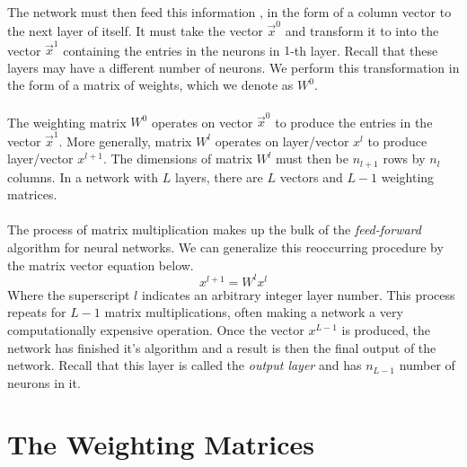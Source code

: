 \documentclass[12pt,letterpaper]{article}
\begin{document}
\paragraph*{}The network must then feed this information , in the form of a column vector to the next layer of itself. It must take the vector $\vec{x}^0$ and transform it to into the vector $\vec{x}^1$ containing the entries in the neurons in $1$-th layer. Recall that these layers may have a different number of neurons. We perform this transformation in the form of a matrix of weights, which we denote as $W^0$.
\paragraph*{}The weighting matrix $W^0$ operates on vector $\vec{x}^0$ to produce the entries in the vector $\vec{x}^1$. More generally, matrix $W^l$ operates on layer/vector $x^l$ to produce layer/vector $x^{l+1}$. The dimensions of matrix $W^l$ must then be $n_{l+1}$ rows by $n_l$ columns. In a network with $L$ layers, there are $L$ vectors and $L-1$ weighting matrices.
\paragraph*{}The process of matrix multiplication makes up the bulk of the \textit{feed-forward} algorithm for neural networks. We can generalize this reoccurring procedure by the matrix vector equation below.
\begin{equation}
\label{feed forward}
x^{l+1} = W^l x^l
\end{equation}
Where the superscript $l$ indicates an arbitrary integer layer number. This process repeats for $L-1$ matrix multiplications, often making a network a very computationally expensive operation. Once the vector $x^{L-1}$ is produced, the network has finished it's algorithm and a result is then the final output of the network. Recall that this layer is called the \textit{output layer} and has $n_{L-1}$ number of neurons in it. 


\section{The Weighting Matrices}
\end{document}
